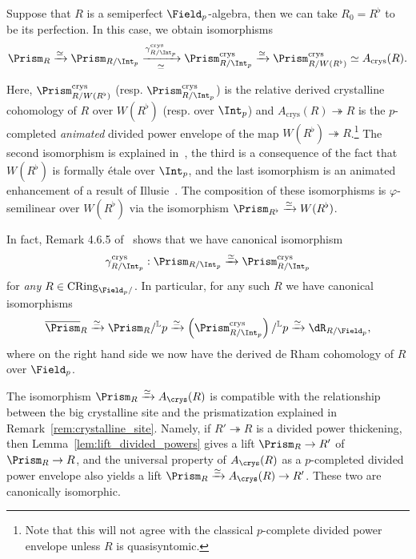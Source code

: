 \documentclass[10pt]{amsart}
\begin{document}
\begin{remark}
\label{rem:derived_crystalline_semiperfect}
Suppose that $R$ is a semiperfect $\Field_p$-algebra, then we can take $R_0 = R^\flat$ to be its perfection. In this case, we obtain isomorphisms
\begin{align}\label{eqn:semiperfect_prismatization}
\Prism_{R}\xrightarrow{\simeq}\Prism_{R/\Int_p}\xrightarrow[\simeq]{\gamma_{R/\Int_p}^{\mathrm{crys}}}\Prism^{\mathrm{crys}}_{R/\Int_p}\xrightarrow{\simeq}\Prism^{\mathrm{crys}}_{R/W(R^\flat)}\simeq A_{\mathrm{crys}}(R).
\end{align}

Here, $\Prism^{\mathrm{crys}}_{R/W(R^\flat)}$ (resp. $\Prism^{\mathrm{crys}}_{R/\Int_p}$) is the relative derived crystalline cohomology of $R$ over $W(R^\flat)$ (resp. over $\Int_p$) and $A_{\mathrm{crys}}(R)\twoheadrightarrow R$ is the $p$-completed \emph{animated} divided power envelope of the map $W(R^\flat)\twoheadrightarrow R$.\footnote{Note that this will not agree with the classical $p$-complete divided power envelope unless $R$ is quasisyntomic.} The second isomorphism is explained in~\cite[Remark 4.6.5]{bhatt2022absolute}, the third is a consequence of the fact that $W(R^\flat)$ is formally \'etale over $\Int_p$, and the last isomorphism is an animated enhancement of a result of Illusie~\cite[Prop. 4.64]{Mao2021-jt}. The composition of these isomorphisms is $\varphi$-semilinear over $W(R^\flat)$ via the isomorphism $\Prism_{R^\flat}\xrightarrow{\simeq}W(R^\flat)$. 

In fact, Remark 4.6.5 of~\cite{bhatt2022absolute} shows that we have canonical isomorphism
\[
\gamma_{R/\Int_p}^{\mathrm{crys}}:\Prism_{R/\Int_p}\xrightarrow{\simeq}\Prism^{\mathrm{crys}}_{R/\Int_p}
\]
for \emph{any} $R\in \mathrm{CRing}_{\Field_p/}$. In particular, for any such $R$ we have canonical isomorphisms
\begin{equation}
\label{eqn:semiperfect_mod_p_prismatization}
\overline{\Prism}_R\xrightarrow{\simeq} \Prism_R/{}^{\mathbb{L}}p\xrightarrow{\simeq}\left(\Prism^{\mathrm{crys}}_{R/\Int_p}\right)/{}^{\mathbb{L}}p\xrightarrow{\simeq}\dR_{R/\Field_p},
\end{equation}
where on the right hand side we now have the derived de Rham cohomology of $R$ over $\Field_p$.
\end{remark}

\begin{remark}
\label{rem:crys_cohomology_de_rham}
The isomorphism $\Prism_R\xrightarrow{\simeq}A_{\crys}(R)$ is compatible with the relationship between the big crystalline site and the prismatization explained in Remark~\ref{rem:crystalline_site}. Namely, if $R'\twoheadrightarrow R$ is a divided power thickening, then Lemma~\ref{lem:lift_divided_powers} gives a lift $\Prism_R\to R'$ of $\Prism_R\to R$, and the universal property of $A_{\crys}(R)$ as a $p$-completed divided power envelope also yields a lift $\Prism_R\xrightarrow{\simeq}A_{\crys}(R)\to R'$. These two are canonically isomorphic.
\end{remark}
\end{document}
